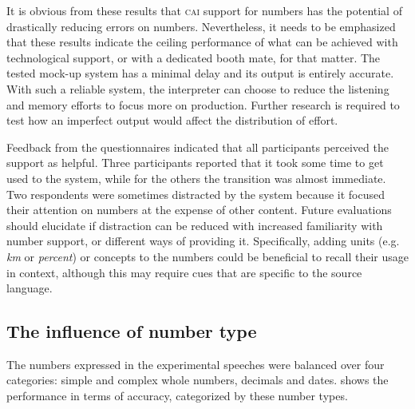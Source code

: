 \documentclass[output=paper]{langsci/langscibook}
\begin{document}
It is obvious from these results that \textsc{cai} support for numbers has the potential of drastically reducing errors on numbers. Nevertheless, it needs to be emphasized that these results indicate the ceiling performance of what can be achieved with technological support, or with a dedicated booth mate, for that matter. The tested mock-up system has a minimal delay and its output is entirely accurate. With such a reliable system, the interpreter can choose to reduce the listening and memory efforts to focus more on production. Further research is required to test how an imperfect output would affect the distribution of effort.

Feedback from the questionnaires indicated that all participants perceived the support as helpful. Three participants reported that it took some time to get used to the system, while for the others the transition was almost immediate. Two respondents were sometimes distracted by the system because it focused their attention on numbers at the expense of other content. Future evaluations should elucidate if distraction can be reduced with increased familiarity with number support, or different ways of providing it. Specifically, adding units (e.g. \textit{km} or \textit{percent}) or concepts to the numbers could be beneficial to recall their usage in context, although this may require cues that are specific to the source language.

\subsection{The influence of number type}\largerpage
The numbers expressed in the experimental speeches were balanced over four categories: simple and complex whole numbers, decimals and dates.  shows the performance in terms of accuracy, categorized by these number types.
\end{document}
